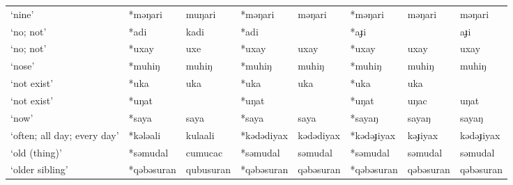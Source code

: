 \begin{landscape}
\begin{longtable}[c]{@{}p{3cm}<{\raggedright}p{2.75cm}<{\raggedright}p{2.75cm}<{\raggedright}p{2.75cm}<{\raggedright}p{2.75cm}<{\raggedright}p{2.75cm}<{\raggedright}p{2.75cm}<{\raggedright}p{2.75cm}<{\raggedright}@{}}
`nine'                                               & *məŋari      & muŋari                        & *məŋari        & məŋari                     & *məŋari          & məŋari                   & məŋari                            \\
`no; not'                                            & *adi         & kadi                          & *adi           &                            & *aɟi             &                          & aɟi                               \\
`no; not'                                            & *uxay        & uxe                           & *uxay          & uxay                       & *uxay            & uxay                     & uxay                              \\
`nose'                                               & *muhiŋ       & muhiŋ                         & *muhiŋ         & muhiŋ                      & *muhiŋ           & muhiŋ                    & muhiŋ                             \\
`not exist'                                          & *uka         & uka                           & *uka           & uka                        & *uka             & uka                      &                                   \\
`not exist'                                          & *uŋat        &                               & *uŋat          &                            & *uŋat            & uŋac                     & uŋat                              \\
`now'                                                & *saya        & saya                          & *saya          & saya                       & *sayaŋ           & sayaŋ                    & sayaŋ                             \\
`often; all day; every day'                          & *kələali     & kulaali                       & *kədədiyax     & kədədiyax                  & *kədəɟiyax       & kəɟiyax                  & kədəɟiyax                         \\
`old (thing)'                                        & *səmudal     & cumucac                       & *səmudal       & səmudal                    & *səmudal         & səmudal                  & səmudal                           \\
`older sibling'                                      & *qəbəsuran   & qubusuran                     & *qəbəsuran     & qəbəsuran                  & *qəbəsuran       & qəbəsuran                & qəbəsuran                         \\

\end{longtable}
\end{landscape}
